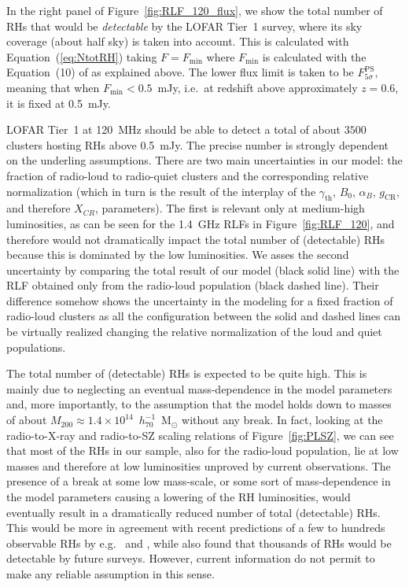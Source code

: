 \documentclass[traditabstract]{aa}
\newcommand{\rmn}{\mathrm}
\begin{document}
In the right panel of Figure~\ref{fig:RLF_120_flux}, we show the total number of RHs that would be \emph{detectable} by the LOFAR Tier~1 survey, where its sky coverage (about half sky) is taken into account. This is calculated with Equation~(\ref{eq:NtotRH}) taking $F = F_{\rmn{min}}$ where $F_{\rmn{min}}$ is calculated with the Equation~(10) of \cite{2010A&A...509A..68C} as explained above. The lower flux limit is taken to be $F_{5\sigma}^{\rmn{PS}}$, meaning that when $F_{\rmn{min}} < 0.5$~mJy, i.e.~at redshift above approximately $z = 0.6$, it is fixed at 0.5~mJy.  

LOFAR Tier~1 at 120~MHz should be able to detect a total of about $3500$ clusters hosting RHs above 0.5~mJy. The precise number is strongly dependent on the underling assumptions. There are two main uncertainties in our model: the fraction of radio-loud to radio-quiet clusters and the corresponding relative normalization (which in turn is the result of the interplay of the $\gamma_{\rmn{th}}$, $B_{0}$, $\alpha_{B}$, $g_{\rmn{CR}}$, and therefore $X_{CR}$, parameters). The first is relevant only at medium-high luminosities, as can be seen for the 1.4~GHz RLFs in Figure~\ref{fig:RLF_120}, and therefore would not dramatically impact the total number of (detectable) RHs because this is dominated by the low luminosities. We asses the second uncertainty by comparing the total result of our model (black solid line) with the RLF obtained only from the radio-loud population (black dashed line). Their difference somehow shows the uncertainty in the modeling for a fixed fraction of radio-loud clusters as all the configuration between the solid and dashed lines can be virtually realized changing the relative normalization of the loud and quiet populations. 

The total number of (detectable) RHs is expected to be quite high. This is mainly due to neglecting an eventual mass-dependence in the model parameters and, more importantly, to the assumption that the model holds down to masses of about $M_{200}\approx1.4\times10^{14}$~$h_{70}^{-1}$~M$_{\odot}$ without any break. In fact, looking at the radio-to-X-ray and radio-to-SZ scaling relations of Figure~\ref{fig:PLSZ}, we can see that most of the RHs in our sample, also for the radio-loud population, lie at low masses and therefore at low luminosities unproved by current observations. The presence of a break at some low mass-scale, or some sort of mass-dependence in the model parameters causing a lowering of the RH luminosities, would eventually result in a dramatically reduced number of total (detectable) RHs. This would be more in agreement with recent predictions of a few to hundreds observable RHs by e.g.~\cite{2010A&A...509A..68C} and \cite{2011arXiv1110.2786S}, while \cite{2002A&A...396...83E} also found that thousands of RHs would be detectable by future surveys. However, current information do not permit to make any reliable assumption in this sense. 
\end{document}
